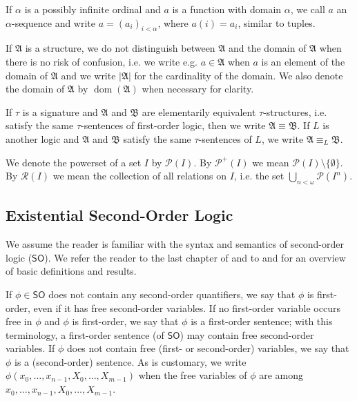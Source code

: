 \documentclass[a4paper]{amsart}
\theoremstyle{definition}
\theoremstyle{remark}
\newcommand{\A}{\mathcal{A}}
\newcommand{\B}{\mathcal{B}}
\DeclareMathOperator{\Pow}{\wp}
\DeclareMathOperator{\dom}{dom}
\newcommand\sol{\mathsf{SO}}
\newcommand{\R}{\mathcal{R}}
\theoremstyle{definition}
\renewcommand{\A}{\mathfrak{A}}
\renewcommand{\B}{\mathfrak{B}}
\renewcommand{\Pow}{\mathcal{P}}
\begin{document}
If $\alpha$ is a possibly infinite ordinal and $a$ is a function with domain $\alpha$, we call $a$ an $\alpha$-sequence and write $a = (a_i)_{i<\alpha}$, where $a(i) = a_i$, similar to tuples. %



If $\A$ is a structure, we do not distinguish between $\A$ and the domain of $\A$ when there is no risk of confusion, i.e. we write e.g. $a\in\A$ when $a$ is an element of the domain of $\A$ and we write $|\A|$ for the cardinality of the domain. We also denote the domain of $\A$ by $\dom(\A)$ when necessary for clarity.

If $\tau$ is a signature and $\A$ and $\B$ are elementarily equivalent $\tau$-structures, i.e. satisfy the same $\tau$-sentences of first-order logic, then we write $\A\equiv\B$. If $L$ is another logic and $\A$ and $\B$ satisfy the same $\tau$-sentences of $L$, we write $\A\equiv_L\B$.

We denote the powerset of a set $I$ by $\Pow(I)$. By $\Pow^+(I)$ we mean $\Pow(I)\setminus\{\emptyset\}$. By $\R(I)$ we mean the collection of all relations on $I$, i.e. the set $\bigcup_{n<\omega}\Pow(I^n)$.



\subsection{Existential Second-Order Logic}
We assume the reader is familiar with the syntax and semantics of second-order logic ($\sol$).
We refer the reader to the last chapter of \cite{enderton2001logic} and to \cite{vanbenthem2001higher} and \cite{sep-logic-higher-order} for an overview of basic definitions and results.

If $\phi\in\sol$ does not contain any second-order quantifiers, we say that $\phi$ is first-order, even if it has free second-order variables. If no first-order variable occurs free in $\phi$ and $\phi$ is first-order, we say that $\phi$ is a first-order sentence; with this terminology, a first-order sentence (of $\sol$) may contain free second-order variables. If $\phi$ does not contain free (first- or second-order) variables, we say that $\phi$ is a (second-order) sentence. As is customary, we write $\phi(x_0,\dots,x_{n-1},X_0,\dots,X_{m-1})$ when the free variables of $\phi$ are among $x_0,\dots,x_{n-1},X_0,\dots,X_{m-1}$.
\end{document}
